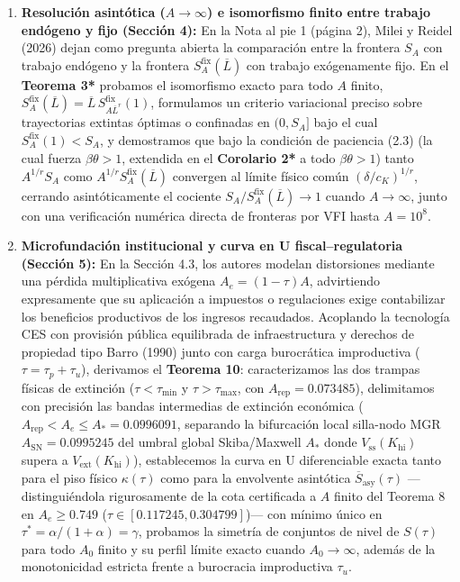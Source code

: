 \documentclass[11pt,letterpaper]{article}
\theoremstyle{plain}
\begin{document}
\begin{enumerate}
\item \textbf{Resolución asintótica ($A\to\infty$) e isomorfismo finito entre trabajo endógeno y fijo (Sección 4):} En la Nota al pie 1 (página 2), Milei y Reidel (2026) dejan como pregunta abierta la comparación entre la frontera $S_A$ con trabajo endógeno y la frontera $S_A^{\mathrm{fix}}(\overline{L})$ con trabajo exógenamente fijo. En el \textbf{Teorema 3*} probamos el isomorfismo exacto para todo $A$ finito, $S_A^{\mathrm{fix}}(\overline{L}) = \overline{L}\,S_{A\overline{L}^r}^{\mathrm{fix}}(1)$, formulamos un criterio variacional preciso sobre trayectorias extintas óptimas o confinadas en $(0,S_A]$ bajo el cual $S_A^{\mathrm{fix}}(1) < S_A$, y demostramos que bajo la condición de paciencia (2.3) (la cual fuerza $\beta\theta>1$, extendida en el \textbf{Corolario 2*} a todo $\beta\theta>1$) tanto $A^{1/r}S_A$ como $A^{1/r}S_A^{\mathrm{fix}}(\overline{L})$ convergen al límite físico común $(\delta/c_K)^{1/r}$, cerrando asintóticamente el cociente $S_A/S_A^{\mathrm{fix}}(\overline{L})\to 1$ cuando $A\to\infty$, junto con una verificación numérica directa de fronteras por VFI hasta $A=10^8$.

\item \textbf{Microfundación institucional y curva en U fiscal--regulatoria (Sección 5):} En la Sección 4.3, los autores modelan distorsiones mediante una pérdida multiplicativa exógena $A_e=(1-\tau)A$, advirtiendo expresamente que su aplicación a impuestos o regulaciones exige contabilizar los beneficios productivos de los ingresos recaudados. Acoplando la tecnología CES con provisión pública equilibrada de infraestructura y derechos de propiedad tipo Barro (1990) junto con carga burocrática improductiva ($\tau=\tau_p+\tau_u$), derivamos el \textbf{Teorema 10}: caracterizamos las dos trampas físicas de extinción ($\tau<\tau_{\min}$ y $\tau>\tau_{\max}$, con $A_{\mathrm{rep}}=0.073485$), delimitamos con precisión las bandas intermedias de extinción económica ($A_{\mathrm{rep}}<A_e\le A_*=0.0996091$, separando la bifurcación local silla-nodo MGR $A_{\mathrm{SN}}=0.0995245$ del umbral global Skiba/Maxwell $A_*$ donde $V_{\mathrm{ss}}(K_{\mathrm{hi}})$ supera a $V_{\mathrm{ext}}(K_{\mathrm{hi}})$), establecemos la curva en U diferenciable exacta tanto para el piso físico $\kappa(\tau)$ como para la envolvente asintótica $\overline{S}_{\mathrm{asy}}(\tau)$ ---distinguiéndola rigurosamente de la cota certificada a $A$ finito del Teorema 8 en $A_e\ge 0.749$ ($\tau\in[0.117245,0.304799]$)--- con mínimo único en $\tau^*=\alpha/(1+\alpha)=\gamma$, probamos la simetría de conjuntos de nivel de $S(\tau)$ para todo $A_0$ finito y su perfil límite exacto cuando $A_0\to\infty$, además de la monotonicidad estricta frente a burocracia improductiva $\tau_u$.


\end{enumerate}
\end{document}
